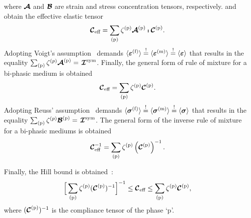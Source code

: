 	where $\mathord{\mbox{\boldmath$\mathcal{A}$}}$ and $\mathord{\mbox{\boldmath$\mathcal{B}$}}$ are strain and stress concentration tensors, respectively.
	and obtain the effective elastic tensor
	\begin{equation}
	\tend{C}_\text{eff}=\sum_\text{(p)}\zeta^\text{(p)} \tend{A}^\text{(p)}\dscp\tend{C}^\text{(p)}.
	\end{equation}
	Adopting Voigt's assumption~\autocite{Voigt.1889} demands $ \avevol{\tenb{\varepsilon}^\text{(f)}}\equimust\avevol{\tenb{\varepsilon}^\text{(m)}}\equimust\avevol{\tenb{\varepsilon}}$ that results in the equality $\sum_\text{(p)}\zeta^{(p)}\mathord{\mbox{\boldmath$\mathcal{A}$}}^\text{(p)}=\mathord{\mbox{\boldmath$\mathcal{\;\!I}$}}^{\text{sym}}$. Finally, the general form of rule of mixture for a bi-phasic medium is obtained
	\begin{equation}
	\mathord{\mbox{\boldmath$\mathcal{C}$}}_\text{eff}=\sum_\text{(p)}\zeta^\text{(p)}\mathord{\mbox{\boldmath$\mathcal{C}$}}^\text{(p)}.
	\end{equation}
	Adopting Reuss' assumption~\autocite{Reuss.1929} demands $ \avevol{\tenb{\sigma}^\text{(f)}}\equimust\avevol{\tenb{\sigma}^\text{(m)}}\equimust\avevol{\tenb{\sigma}}$ that results in the equality  $\sum_\text{(p)}\zeta^{(p)}\mathord{\mbox{\boldmath$\mathcal{B}$}}^\text{(p)}=\mathord{\mbox{\boldmath$\mathcal{\;\!I}$}}^{\text{sym}}$. The general form of the inverse rule of mixture for a bi-phasic mediums is obtained
	\begin{equation}
	\mathord{\mbox{\boldmath$\mathcal{C}$}}^{-1}_\text{eff}=\sum_\text{(p)}\zeta^\text{(p)}\left(\mathord{\mbox{\boldmath$\mathcal{C}$}}^\text{(p)}\right)^{-1}.
	\end{equation}	
	
	 Finally, the Hill bound is obtained~\parencite{Bohm.2004}:
	\begin{equation}
		\Big[\sum_\text{(p)}\zeta^\text{(p)}(\mathord{\mbox{\boldmath$\mathcal{C}$}}^\text{(p)})^{-1}\Big]^{-1} \le\mathord{\mbox{\boldmath$\mathcal{C}$}}_\text{eff}\le\sum_\text{(p)}\zeta^\text{(p)}\mathord{\mbox{\boldmath$\mathcal{C}$}}^\text{(p)},
	\end{equation}
	where $(\mathord{\mbox{\boldmath$\mathcal{C}$}}^\text{(p)})^{-1}$ is the compliance tensor of the phase `p'.


